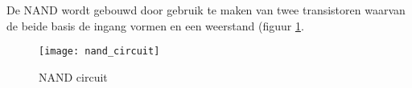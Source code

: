 De NAND wordt gebouwd door gebruik te maken van twee transistoren waarvan de beide basis de ingang vormen en een weerstand (figuur \ref{circuit:nand}.

\begin{figure}[h]
\texttt{[image: nand\_circuit]}
\centering
\caption{NAND circuit}
\label{circuit:nand}
\end{figure}

